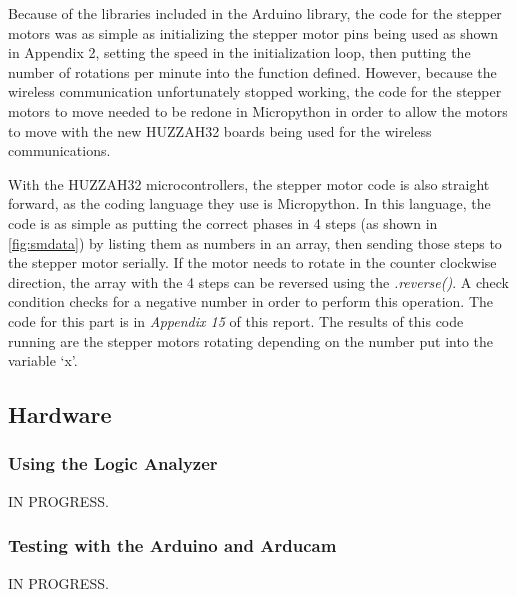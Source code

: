 Because of the libraries included in the Arduino library, the code for the stepper motors was as simple as initializing the stepper motor pins being used as shown in Appendix 2, setting the speed in the initialization loop, then putting the number of rotations per minute into the function defined. However, because the wireless communication unfortunately stopped working, the code for the stepper motors to move needed to be redone in Micropython in order to allow the motors to move with the new HUZZAH32 boards being used for the wireless communications.\par
\setlength{\parindent}{2.5ex}
With the HUZZAH32 microcontrollers, the stepper motor code is also straight forward, as the coding language they use is Micropython. In this language, the code is as simple as putting the correct phases in 4 steps (as shown in \ref{fig:smdata}) by listing them as numbers in an array, then sending those steps to the stepper motor serially. If the motor needs to rotate in the counter clockwise direction, the array with the 4 steps can be reversed using the \textit{.reverse()}. A check condition checks for a negative number in order to perform this operation. The code for this part is in \textit{Appendix 15} of this report. The results of this code running are the stepper motors rotating depending on the number put into the variable `x'.

\subsection{Hardware}
\subsubsection{Using the Logic Analyzer}

IN PROGRESS.

\subsubsection{Testing with the Arduino and Arducam}

IN PROGRESS.

